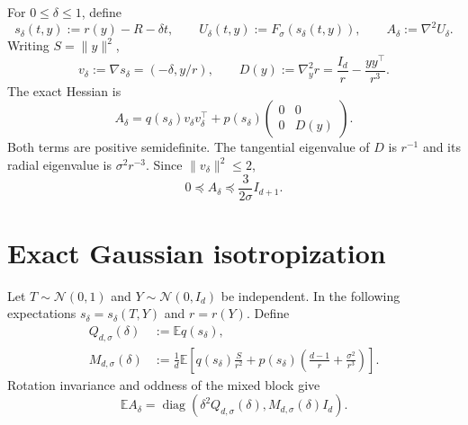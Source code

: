 \documentclass[11pt]{article}
\numberwithin{equation}{section}
\DeclareMathOperator{\diag}{diag}
\newcommand{\E}{\mathbb E}
\begin{document}
For $0\le\delta\le1$, define
\begin{equation}\label{eq:Udelta}
 s_\delta(t,y):=r(y)-R-\delta t,\qquad
 U_\delta(t,y):=F_\sigma(s_\delta(t,y)),\qquad
 A_\delta:=\nabla^2U_\delta.
\end{equation}
Writing $S=\|y\|^2$,
\begin{equation}\label{eq:radial-derivatives}
 v_\delta:=\nabla s_\delta=(-\delta,y/r),\qquad
 D(y):=\nabla_y^2r=\frac{I_d}{r}-\frac{yy^\top}{r^3}.
\end{equation}
The exact Hessian is
\begin{equation}\label{eq:exact-Hessian}
 A_\delta=q(s_\delta)v_\delta v_\delta^\top
 +p(s_\delta)\begin{pmatrix}0&0\\0&D(y)\end{pmatrix}.
\end{equation}
Both terms are positive semidefinite.  The tangential eigenvalue of $D$ is
$r^{-1}$ and its radial eigenvalue is $\sigma^2r^{-3}$.  Since
$\|v_\delta\|^2\le2$,
\begin{equation}\label{eq:A-bound}
 0\preceq A_\delta\preceq\frac{3}{2\sigma}I_{d+1}.
\end{equation}

\section{Exact Gaussian isotropization}\label{sec:isotropization}

Let $T\sim\mathcal N(0,1)$ and $Y\sim\mathcal N(0,I_d)$ be independent.
In the following expectations $s_\delta=s_\delta(T,Y)$ and $r=r(Y)$.
Define
\begin{align}
 Q_{d,\sigma}(\delta)&:=\E q(s_\delta),\label{eq:Qdef}\\
 M_{d,\sigma}(\delta)&:=\frac1d\E\left[
 q(s_\delta)\frac S{r^2}
 +p(s_\delta)\left(\frac{d-1}{r}+\frac{\sigma^2}{r^3}\right)
 \right].\label{eq:Mdef}
\end{align}
Rotation invariance and oddness of the mixed block give
\begin{equation}\label{eq:mean-A}
 \E A_\delta
 =\diag(\delta^2Q_{d,\sigma}(\delta),M_{d,\sigma}(\delta)I_d).
\end{equation}
\end{document}
